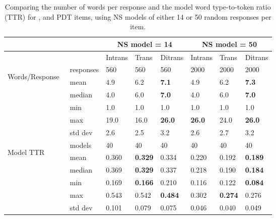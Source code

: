\begin{table}[htb!]
\begin{center}
\setlength{\tabcolsep}{.6em}
\begin{tabular}{|l|l||l|l|l||l|l|l|}
\hline
 && \multicolumn{3}{c||}{NS model = 14} & \multicolumn{3}{c|}{NS model = 50} \\
\hline
	&	& Intrans 	& Trans 	& Ditrans 		& Intrans 	& Trans 	& Ditrans 		\\
\hline
\multirow{3}{*}{\begin{sideways}Words/Response~ \end{sideways}} & responses	& 560  & 560 & 560 & 2000 & 2000 & 2000	 \\
\cline{2-8}
& mean 		& 4.9 	& 6.2		& \textbf{7.1} 	& 4.9		& 6.2 	& \textbf{7.3}	 \\
\cline{2-8}
& median 	& 4.0 	& 6.0		& \textbf{7.0} 	& 4.0		& 6.0 	& \textbf{7.0}	 \\
\cline{2-8}
& min 		& 1.0 	& 1.0		& 1.0 			& 1.0		& 1.0 	& 1.0	 \\
\cline{2-8}
& max 		& 19.0 	& 16.0	& \textbf{26.0} & \textbf{26.0}	& 24.0 	& \textbf{26.0}	 \\
\cline{2-8}
& std dev 	& 2.6 	& 2.5		& 3.2 			& 2.6		& 2.7 	& 3.2	 \\
\hline
\hline
\multirow{3}{*}{\begin{sideways}Model TTR~~~~~ \end{sideways}} & models	& 40 & 40 & 40 	& 40 & 40 & 40	 \\
\cline{2-8}
& mean 		& 0.360 	& \textbf{0.329} 		& 0.334 	& 0.220		& 0.192 		& \textbf{0.189}	 \\
\cline{2-8}
& median 	& 0.369 	& \textbf{0.329}		& 0.337 	& 0.218		& 0.190 		& \textbf{0.184}	 \\
\cline{2-8}
& min 		& 0.169 	& \textbf{0.166}		& 0.210 	& 0.116		& 0.122 		& \textbf{0.084}	 \\
\cline{2-8}
& max 		& 0.543 	& 0.542			& \textbf{0.484} 	& 0.302		& \textbf{0.274} & 0.276	 \\
\cline{2-8}
& std dev 	& 0.101 	& 0.079					& 0.075 	& 0.046		& 0.040 		& 0.049	 \\
\hline
\end{tabular}
\caption{\label{tab:transitivity-model-stats}Comparing the number of words per response and the model word type-to-token ratio (TTR) for ,  and  PDT items, using NS models of either 14 or 50 random responses per item.
}
\end{center}
\end{table}








